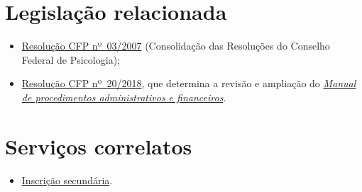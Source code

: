 \section{Legislação	relacionada}

\begin{itemize}
	\item
	\href{https://atosoficiais.com.br/cfp/resolucao-administrativa-financeira-n-3-2007-institui-a-consolidacao-das-resolucoes-do-conselho-federal-de-psicologia?origin=instituicao&q=resolu\%C3\%A7\%C3\%A3o\%203/2007}{Resolução CFP nº~03/2007} (Consolidação das Resoluções do Conselho Federal de Psicologia);
	\item
	\href{https://transparencia.cfp.org.br/wp-content/uploads/sites/7/2020/05/Manual-de-Procedimentos-Administrativos-e-Financeiro-CFP-RES-20.2018.pdf}{\href{https://atosoficiais.com.br/cfp/resolucao-administrativa-financeira-n-20-2018-altera-o-manual-de-procedimentos-administrativo-e-financeiro-do-sistema-conselhos-de-psicologia-anexo-da-resolucao-cfp-n-202018-a-resolucao-cfp-n-03-2007-a-resolucao-cfp-n-16-2019-e-da-outras-providencias}{Resolução CFP nº~20/2018}}, que determina a revisão e ampliação do	\href{https://transparencia.cfp.org.br/wp-content/uploads/sites/7/2020/05/Manual-de-Procedimentos-Administrativos-e-Financeiro-CFP-RES-20.2018.pdf}{\emph{Manual de procedimentos administrativos e financeiros}}.
\end{itemize}

\section{Serviços correlatos}

\begin{itemize}
	\item
	\hyperref[chap:pf-secundaria]{Inscrição secundária}.
\end{itemize}

\sumario